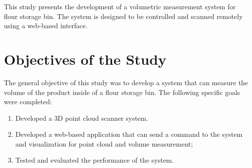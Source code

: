 

This study presents the development of a volumetric measurement system for flour storage bin. The system is designed to be controlled and scanned remotely using a web-based interface.


\section{Objectives of the Study}
\label{intro:sec:Objectives of the Study}
The general objective of this study was to develop a system that can measure the volume of the product inside of a flour storage bin. The following specific goals were completed:

\begin{enumerate}
	\item Developed a 3D point cloud scanner system.
	\item Developed a web-based application that can send a command to the system and visualization for point cloud and volume measurement;
	\item Tested and evaluated the performance of the system.
\end{enumerate}

